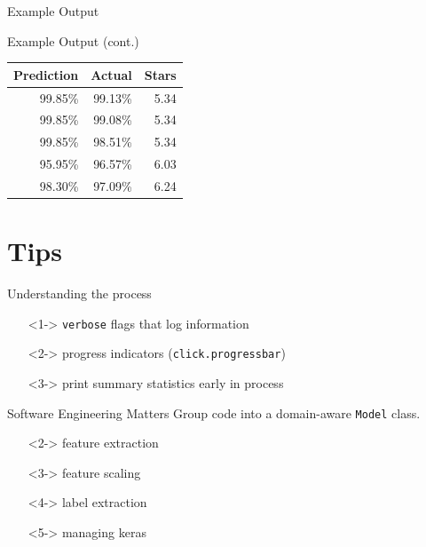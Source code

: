 \documentclass[table]{beamer}
\begin{document}
\begin{frame}{Example Output}
\end{frame}

\begin{frame}{Example Output (cont.)}
  \begin{center}
    \begin{tabular}{r | r | r}
      Prediction & Actual & Stars \\
      \hline
      99.85\% & 99.13\% & 5.34 \\
      99.85\% & 99.08\% & 5.34 \\
      99.85\% & 98.51\% & 5.34 \\
      95.95\% & 96.57\% & 6.03 \\
      98.30\% & 97.09\% & 6.24
    \end{tabular}
  \end{center}
\end{frame}

\section{Tips}

\begin{frame}{Understanding the process}
  \begin{itemize}
  \item[]<1-> \texttt{verbose} flags that log information
  \item[]<2-> progress indicators (\texttt{click.progressbar})
  \item[]<3-> print summary statistics early in process
  \end{itemize}
\end{frame}

\begin{frame}{Software Engineering Matters}
  Group code into a domain-aware \texttt{Model} class.

  \begin{itemize}
  \item[]<2-> feature extraction
  \item[]<3-> feature scaling
  \item[]<4-> label extraction
  \item[]<5-> managing keras
  \end{itemize}
\end{frame}
\end{document}

